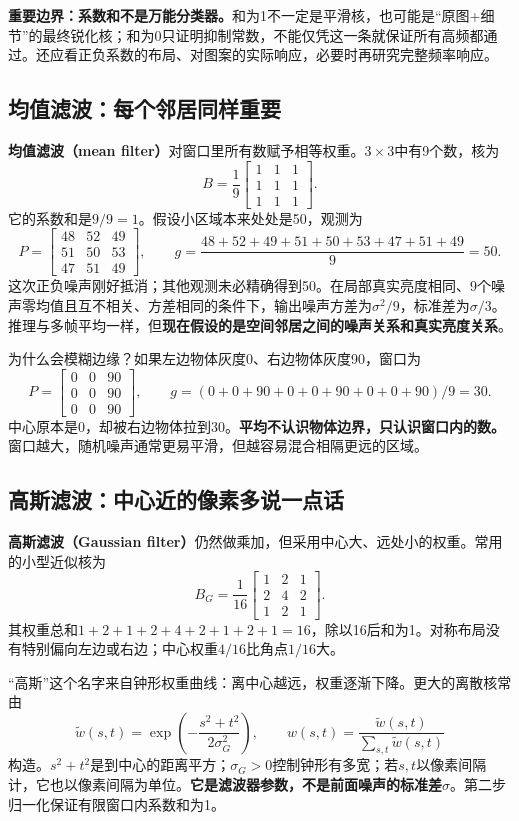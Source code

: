 \textbf{重要边界：系数和不是万能分类器。}和为1不一定是平滑核，也可能是“原图+细节”的最终锐化核；和为0只证明抑制常数，不能仅凭这一条就保证所有高频都通过。还应看正负系数的布局、对图案的实际响应，必要时再研究完整频率响应。

\subsection{均值滤波：每个邻居同样重要}
\textbf{均值滤波（mean filter）}对窗口里所有数赋予相等权重。$3\times3$中有9个数，核为
\[
 B=\frac19\begin{bmatrix}1&1&1\\1&1&1\\1&1&1\end{bmatrix}.
\]
它的系数和是$9/9=1$。假设小区域本来处处是50，观测为
\[
 P=\begin{bmatrix}48&52&49\\51&50&53\\47&51&49\end{bmatrix},
 \qquad
 g=\frac{48+52+49+51+50+53+47+51+49}{9}=50.
\]
这次正负噪声刚好抵消；其他观测未必精确得到50。在局部真实亮度相同、9个噪声零均值且互不相关、方差相同的条件下，输出噪声方差为$\sigma^2/9$，标准差为$\sigma/3$。推理与多帧平均一样，但\textbf{现在假设的是空间邻居之间的噪声关系和真实亮度关系}。

为什么会模糊边缘？如果左边物体灰度0、右边物体灰度90，窗口为
\[
 P=\begin{bmatrix}0&0&90\\0&0&90\\0&0&90\end{bmatrix},
 \qquad g=(0+0+90+0+0+90+0+0+90)/9=30.
\]
中心原本是0，却被右边物体拉到30。\textbf{平均不认识物体边界，只认识窗口内的数。}窗口越大，随机噪声通常更易平滑，但越容易混合相隔更远的区域。

\subsection{高斯滤波：中心近的像素多说一点话}
\textbf{高斯滤波（Gaussian filter）}仍然做乘加，但采用中心大、远处小的权重。常用的小型近似核为
\[
 B_G=\frac1{16}\begin{bmatrix}1&2&1\\2&4&2\\1&2&1\end{bmatrix}.
\]
其权重总和$1+2+1+2+4+2+1+2+1=16$，除以16后和为1。对称布局没有特别偏向左边或右边；中心权重$4/16$比角点$1/16$大。

“高斯”这个名字来自钟形权重曲线：离中心越远，权重逐渐下降。更大的离散核常由
\[
 \widetilde w(s,t)=\exp\!\left(-\frac{s^2+t^2}{2\sigma_G^2}\right),
 \qquad
 w(s,t)=\frac{\widetilde w(s,t)}{\sum_{s,t}\widetilde w(s,t)}
\]
构造。$s^2+t^2$是到中心的距离平方；$\sigma_G>0$控制钟形有多宽；若$s,t$以像素间隔计，它也以像素间隔为单位。\textbf{它是滤波器参数，不是前面噪声的标准差$\sigma$}。第二步归一化保证有限窗口内系数和为1。

